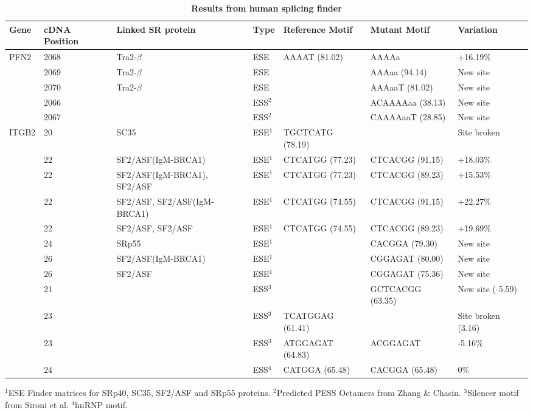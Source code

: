 \documentclass[10pt]{article}
\begin{document}
\begin{table}[!ht]
\caption{
\bf{Results from human splicing finder}}
\begin{tabular}{|l|p{1cm}|p{3cm}|l|l|l|l|}
\hline
Gene &  cDNA Position & Linked SR protein & Type & Reference Motif & Mutant Motif & Variation \\
\hline
PFN2 & 2068 & Tra2-$\beta$ & ESE & AAAAT (81.02) & AAAAa & +16.19\% \\
 & 2069 & Tra2-$\beta$ & ESE & & AAAaa (94.14) & New site \\
 & 2070 & Tra2-$\beta$ & ESE & & AAAaaT (81.02) & New site \\
 & 2066 & & ESS$^{2}$ & & ACAAAAaa (38.13) & New site \\
 & 2067 & & ESS$^{2}$ & & CAAAAaaT (28.85) & New site \\
\hline
ITGB2 & 20 & SC35 & ESE$^{1}$ & TGCTCATG (78.19) & & Site broken \\
 & 22 & SF2/ASF(IgM-BRCA1) & ESE$^{1}$ & CTCATGG (77.23) & CTCACGG (91.15) & +18.03\% \\
 & 22 & SF2/ASF(IgM-BRCA1), SF2/ASF & ESE$^{1}$ & CTCATGG (77.23) & CTCACGG (89.23) & +15.53\% \\
 & 22 & SF2/ASF, SF2/ASF(IgM-BRCA1) & ESE$^{1}$ & CTCATGG (74.55) & CTCACGG (91.15) & +22.27\% \\
 & 22 & SF2/ASF, SF2/ASF & ESE$^{1}$ & CTCATGG (74.55) & CTCACGG (89.23) & +19.69\% \\
 & 24 & SRp55 & ESE$^{1}$ & & CACGGA (79.30) & New site \\
 & 26 & SF2/ASF(IgM-BRCA1) & ESE$^{1}$ & & CGGAGAT (80.00) & New site \\
 & 26 & SF2/ASF & ESE$^{1}$ & & CGGAGAT (75.36) & New site \\
 & 21 & & ESS$^{3}$ & & GCTCACGG (63.35) & New site (-5.59) \\
 & 23 & & ESS$^{3}$ & TCATGGAG (61.41) & & Site broken (3.16) \\
 & 23 & & ESS$^{3}$ & ATGGAGAT (64.83) & ACGGAGAT & -5.16\% \\
 & 24 & & ESS$^{4}$ & CATGGA (65.48) & CACGGA (65.48) & 0\% \\
\hline

\end{tabular}
\begin{flushleft}
    $^{1}$ESE Finder matrices for SRp40, SC35, SF2/ASF and SRp55 proteins.
    $^{2}$Predicted PESS Octamers from Zhang \& Chasin.
    $^{3}$Silencer motif from Sironi et al.
    $^{4}$hnRNP motif.
\end{flushleft}
\label{tab:spliceosome}
\end{table}
\end{document}
